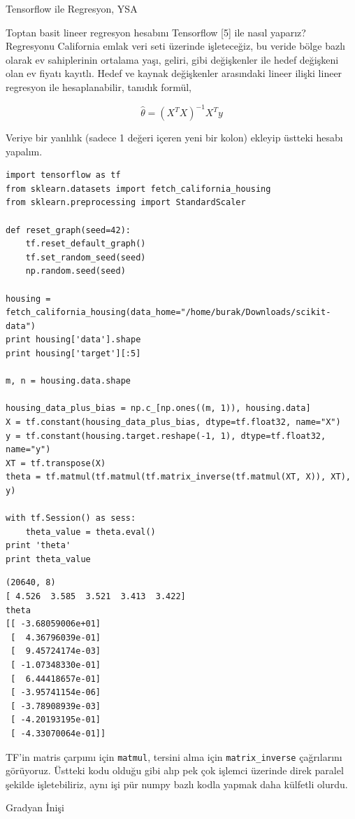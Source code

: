 \documentclass[12pt,fleqn]{article}\usepackage{../../common}
\begin{document}
Tensorflow ile Regresyon, YSA

Toptan basit lineer regresyon hesabını Tensorflow [5] ile nasıl yaparız?
Regresyonu California emlak veri seti üzerinde işleteceğiz, bu veride bölge
bazlı olarak ev sahiplerinin ortalama yaşı, geliri, gibi değişkenler ile hedef
değişkeni olan ev fiyatı kayıtlı. Hedef ve kaynak değişkenler arasındaki lineer
ilişki lineer regresyon ile hesaplanabilir, tanıdık formül,

$$
\hat{\theta} = (X^TX )^{-1} X^T y
$$

Veriye bir yanlılık (sadece 1 değeri içeren yeni bir kolon) ekleyip üstteki
hesabı yapalım.

\begin{verbatim}
import tensorflow as tf
from sklearn.datasets import fetch_california_housing
from sklearn.preprocessing import StandardScaler

def reset_graph(seed=42):
    tf.reset_default_graph()
    tf.set_random_seed(seed)
    np.random.seed(seed)

housing = fetch_california_housing(data_home="/home/burak/Downloads/scikit-data")
print housing['data'].shape
print housing['target'][:5]

m, n = housing.data.shape

housing_data_plus_bias = np.c_[np.ones((m, 1)), housing.data]
X = tf.constant(housing_data_plus_bias, dtype=tf.float32, name="X")
y = tf.constant(housing.target.reshape(-1, 1), dtype=tf.float32, name="y")
XT = tf.transpose(X)
theta = tf.matmul(tf.matmul(tf.matrix_inverse(tf.matmul(XT, X)), XT), y)

with tf.Session() as sess:
    theta_value = theta.eval()
print 'theta'
print theta_value
\end{verbatim}

\begin{verbatim}
(20640, 8)
[ 4.526  3.585  3.521  3.413  3.422]
theta
[[ -3.68059006e+01]
 [  4.36796039e-01]
 [  9.45724174e-03]
 [ -1.07348330e-01]
 [  6.44418657e-01]
 [ -3.95741154e-06]
 [ -3.78908939e-03]
 [ -4.20193195e-01]
 [ -4.33070064e-01]]
\end{verbatim}

TF'in matris çarpımı için \verb!matmul!, tersini alma için
\verb!matrix_inverse! çağrılarını görüyoruz. Üstteki kodu olduğu gibi alıp
pek çok işlemci üzerinde direk paralel şekilde işletebiliriz, aynı işi pür
numpy bazlı kodla yapmak daha külfetli olurdu.

Gradyan İnişi
\end{document}

